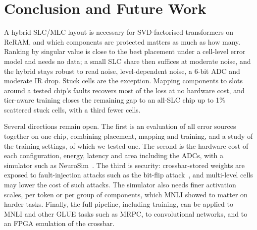\section{Conclusion and Future Work}\label{sec:conclusion}

A hybrid SLC/MLC layout is necessary for SVD-factorised transformers on ReRAM, and which components are
protected matters as much as how many. Ranking by singular value is close to the best placement under a
cell-level error model and needs no data; a small SLC share then suffices at moderate noise, and the hybrid
stays robust to read noise, level-dependent noise, a 6-bit ADC and moderate IR drop. Stuck cells are the
exception. Mapping components to slots around a tested chip's faults recovers most of the loss at no
hardware cost, and tier-aware training closes the remaining gap to an all-SLC chip up to 1\% scattered stuck
cells, with a third fewer cells.

Several directions remain open. The first is an evaluation of all error sources together on one chip,
combining placement, mapping and training, and a study of the training settings, of which we tested
one. The second is the hardware cost of each configuration, energy,
latency and area including the ADCs, with a simulator such as NeuroSim~\cite{peng2019neurosim}. The third
is security: crossbar-stored weights are exposed to fault-injection attacks such as the bit-flip
attack~\cite{rakin2019bfa}, and multi-level cells may lower the cost of such attacks. The simulator also needs finer activation scales, per token or per group of
components, which MNLI showed to matter on harder tasks. Finally, the full pipeline, including training,
can be applied to MNLI and other GLUE tasks such as MRPC, to convolutional networks, and to an FPGA
emulation of the crossbar.
